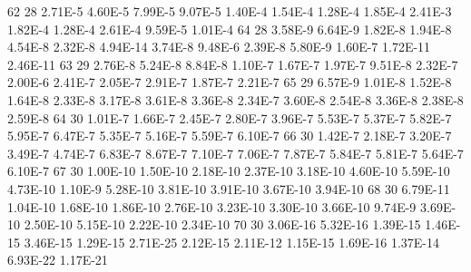     62 28	2.71E-5 	4.60E-5 	7.99E-5 	9.07E-5 	1.40E-4 	1.54E-4 	1.28E-4 	1.85E-4 	2.41E-3 	1.82E-4 	1.28E-4 	2.61E-4 	9.59E-5 	1.01E-4
    64 28	3.58E-9 	6.64E-9 	1.82E-8 	1.94E-8 	4.54E-8 	2.32E-8 	4.94E-14 	3.74E-8 	9.48E-6 	2.39E-8 	5.80E-9 	1.60E-7 	1.72E-11 	2.46E-11
    63 29	2.76E-8 	5.24E-8 	8.84E-8 	1.10E-7 	1.67E-7 	1.97E-7 	9.51E-8 	2.32E-7 	2.00E-6 	2.41E-7 	2.05E-7 	2.91E-7 	1.87E-7 	2.21E-7
    65 29	6.57E-9 	1.01E-8 	1.52E-8 	1.64E-8 	2.33E-8 	3.17E-8 	3.61E-8 	3.36E-8 	2.34E-7 	3.60E-8 	2.54E-8 	3.36E-8 	2.38E-8 	2.59E-8
    64 30	1.01E-7 	1.66E-7 	2.45E-7 	2.80E-7 	3.96E-7 	5.53E-7 	5.37E-7 	5.82E-7 	5.95E-7 	6.47E-7 	5.35E-7 	5.16E-7 	5.59E-7 	6.10E-7
    66 30	1.42E-7 	2.18E-7 	3.20E-7 	3.49E-7 	4.74E-7 	6.83E-7 	8.67E-7 	7.10E-7 	7.06E-7 	7.87E-7 	5.84E-7 	5.81E-7 	5.64E-7 	6.10E-7
    67 30	1.00E-10 	1.50E-10 	2.18E-10 	2.37E-10 	3.18E-10 	4.60E-10 	5.59E-10 	4.73E-10 	1.10E-9 	5.28E-10 	3.81E-10 	3.91E-10 	3.67E-10 	3.94E-10
    68 30	6.79E-11 	1.04E-10 	1.68E-10 	1.86E-10 	2.76E-10 	3.23E-10 	3.30E-10 	3.66E-10 	9.74E-9 	3.69E-10 	2.50E-10 	5.15E-10 	2.22E-10 	2.34E-10
    70 30	3.06E-16 	5.32E-16 	1.39E-15 	1.46E-15 	3.46E-15 	1.29E-15 	2.71E-25 	2.12E-15 	2.11E-12 	1.15E-15 	1.69E-16 	1.37E-14 	6.93E-22 	1.17E-21

